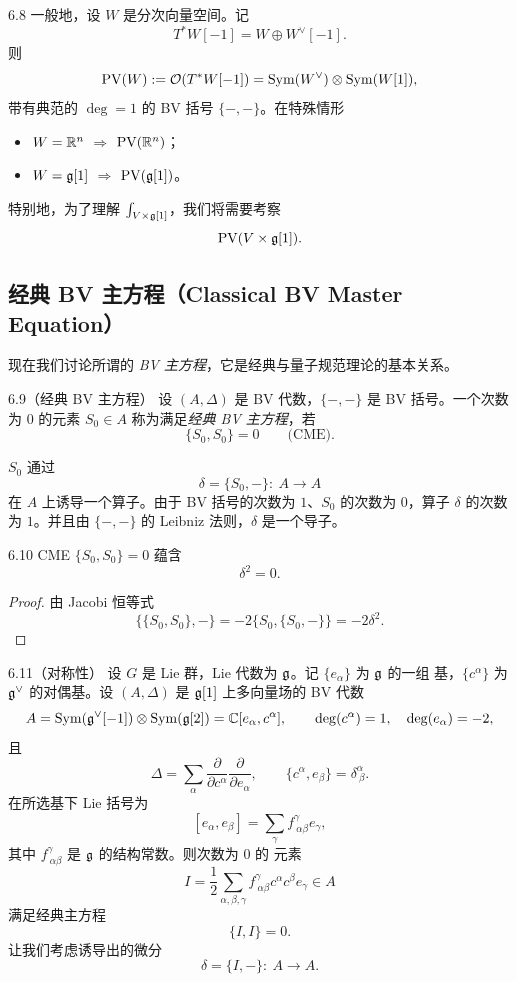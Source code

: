 \begin{wexam}{6.8}
一般地，设 $W$ 是分次向量空间。记
\[
  T^*W[-1]=W\oplus W^{\vee}[-1].
\]
则
\[
  \mathrm{PV}(W):=\mathcal{O}(T^*W[-1])
  =\operatorname{Sym}(W^{\vee})\otimes\operatorname{Sym}(W[1]),
\]
带有典范的 $\deg=1$ 的 BV 括号 $\{-,-\}$。在特殊情形
\begin{itemize}[leftmargin=1.4em,itemsep=0.1em]
  \item $W=\mathbb{R}^n$ $\Longrightarrow$ $\mathrm{PV}(\mathbb{R}^n)$；
  \item $W=\mathfrak{g}[1]$ $\Longrightarrow$ $\mathrm{PV}(\mathfrak{g}[1])$。
\end{itemize}
特别地，为了理解 $\int_{V\times\mathfrak{g}[1]}$，我们将需要考察
\[
  \mathrm{PV}(V\times\mathfrak{g}[1]).
\]
\end{wexam}


\subsection{经典 BV 主方程（Classical BV Master Equation）}

现在我们讨论所谓的 \emph{BV 主方程}，它是经典与量子规范理论的基本关系。

\begin{wdefn}{6.9}（经典 BV 主方程）
设 $(A,\Delta)$ 是 BV 代数，$\{-,-\}$ 是 BV 括号。一个次数为 $0$ 的元素
$S_0\in A$ 称为满足\emph{经典 BV 主方程}，若
\[
  \{S_0,S_0\}=0\qquad\text{(CME)}.
\]
\end{wdefn}

$S_0$ 通过
\[
  \delta=\{S_0,-\}:\ A\longrightarrow A
\]
在 $A$ 上诱导一个算子。由于 BV 括号的次数为 $1$、$S_0$ 的次数为 $0$，算子
$\delta$ 的次数为 $1$。并且由 $\{-,-\}$ 的 Leibniz 法则，$\delta$ 是一个导子。

\begin{wprop}{6.10}
CME $\{S_0,S_0\}=0$ 蕴含
\[
  \delta^2=0.
\]
\end{wprop}

\begin{proof}
由 Jacobi 恒等式
\[
  \{\{S_0,S_0\},-\}
  =-2\{S_0,\{S_0,-\}\}
  =-2\delta^2.
\]
\end{proof}


\begin{wexam}{6.11}（对称性）
设 $G$ 是 Lie 群，Lie 代数为 $\mathfrak{g}$。记 $\{e_\alpha\}$ 为 $\mathfrak{g}$ 的一组
基，$\{c^\alpha\}$ 为 $\mathfrak{g}^{\vee}$ 的对偶基。设 $(A,\Delta)$ 是
$\mathfrak{g}[1]$ 上多向量场的 BV 代数
\[
  A=\operatorname{Sym}(\mathfrak{g}^{\vee}[-1])\otimes\operatorname{Sym}(\mathfrak{g}[2])
  =\mathbb{C}[e_\alpha,c^\alpha],\qquad
  \deg(c^\alpha)=1,\quad \deg(e_\alpha)=-2,
\]
且
\[
  \Delta=\sum_\alpha\frac{\partial}{\partial c^\alpha}
  \frac{\partial}{\partial e_\alpha},
  \qquad
  \{c^\alpha,e_\beta\}=\delta^\alpha_{\ \beta}.
\]
在所选基下 Lie 括号为
\[
  [e_\alpha,e_\beta]=\sum_\gamma f^{\gamma}_{\ \alpha\beta}e_\gamma,
\]
其中 $f^{\gamma}_{\ \alpha\beta}$ 是 $\mathfrak{g}$ 的结构常数。则次数为 $0$ 的
元素
\[
  I=\frac{1}{2}\sum_{\alpha,\beta,\gamma}
  f^{\gamma}_{\ \alpha\beta}c^\alpha c^\beta e_\gamma\in A
\]
满足经典主方程
\[
  \{I,I\}=0.
\]
让我们考虑诱导出的微分
\[
  \delta=\{I,-\}:\ A\longrightarrow A.
\]
\end{wexam}

